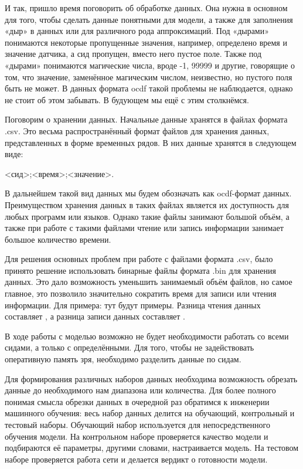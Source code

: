 {\gostFont

  \par \redline И так, пришло время поговорить об обработке данных. Она нужна в основном для того, чтобы сделать данные понятными для модели, а также для заполнения «дыр» в данных или для различного рода аппроксимаций. Под «дырами» понимаются некоторые пропущенные значения, например, определено время и значение датчика, а сид пропущен, вместо него пустое поле. Также под «дырами» понимаются магические числа, вроде -1, 99999 и другие, говорящие о том, что значение, заменённое магическим числом, неизвестно, но пустого поля быть не может. В данных формата ocdf такой проблемы не наблюдается, однако не стоит об этом забывать. В будующем мы ещё с этим столкнёмся.

  \par \redline Поговорим о хранении данных. Начальные данные хранятся в файлах формата .csv. Это весьма распространённый формат файлов для хранения данных, представленных в форме временных рядов. В них данные хранятся в следующем виде: 
  
  \begin{Center}
  <сид>;<время>;<значение>. 
  \end{Center}

  \par \redline В дальнейшем такой вид данных мы будем обозначать как ocdf-формат данных. Преимуществом хранения данных в таких файлах является их доступность для любых программ или языков. Однако такие файлы занимают большой объём, а также при работе с такими файлами чтение или запись информации занимает большое количество времени.  

  \par \redline Для решения основных проблем при работе с файлами формата .csv, было принято решение использовать бинарные файлы формата .bin для хранения данных. Это дало возможность уменьшить занимаемый объём файлов, но самое главное, это позволило значительно сократить время для записи или чтения информации. Для примера: тут будут примеры.   Разница чтения данных составляет , а разница записи данных составляет .

  \par \redline В ходе работы с моделью возможно не будет необходимости работать со всеми сидами, а только с определёнными. Для того, чтобы не задействовать оперативную память зря, необходимо разделить данные по сидам.   

  \par \redline Для формирования различных наборов данных необходима возможность обрезать данные до необходимого нам диапазона или количества. Для более полного понимая смысла обрезки данных в очередной раз обратимся к инженерии машинного обучения: весь набор данных делится на обучающий, контрольный и тестовый наборы. Обучающий набор используется для непосредственного обучения модели. На контрольном наборе проверяется качество модели и подбираются её параметры, другими словами, настраивается модель. На тестовом наборе проверяется работа сети и делается вердикт о готовности модели. 

}
